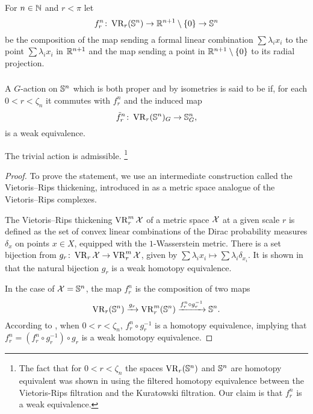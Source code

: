 \subsubsection{}\label{subsub:f}

For \(n \in \mathbb{N}\) and \(r < \pi\) let
\[
f_r^n \colon \operatorname{VR}_r(\mathbb{S}^n) \to \mathbb{R}^{n+1} \setminus \{0\} \to \mathbb{S}^n
\]
be the composition of the map sending a formal linear combination $\sum\lambda_i x_i$ to the point \(\sum\lambda_i x_i\) in \(\mathbb{R}^{n+1}\) and the map sending a point in \(\mathbb{R}^{n+1} \setminus \{0\}\) to its radial projection.

\subsubsection{}

A \(G\)-action on \(\mathbb{S}^n\) which is both proper and by isometries is said to be  if, for each $0 < r < \zeta_n$ it commutes with \(f_r^n\) and the induced map
\[
\tilde f_r^n \colon \operatorname{VR}_r(\mathbb{S}^n)_G \to \mathbb{S}^n_G,
\]
is a weak equivalence.

\medskip\lemma
The trivial action is admissible.
\footnote{The fact that for $0 < r < \zeta_n$ the spaces $\operatorname{VR}_r(\mathbb{S}^n)$ and $\mathbb{S}^n$ are homotopy equivalent was shown in \cite[Theorem 7.1]{lim2020vietoris} using the filtered homotopy equivalence between the Vietoris-Rips filtration and the Kuratowski filtration. Our claim is that $f_r^n$ is a weak equivalence.}

\begin{proof}
	To prove the statement, we use an intermediate construction called the Vietoris--Rips thickening, introduced in \cite{adamaszek2018metric} as a metric space analogue of the Vietoris--Rips complexes.

	The Vietoris--Rips thickening $\operatorname{VR}_r^m\mathcal{X}$ of a metric space $\mathcal{X}$ at a given scale $r$ is defined as the set of convex linear combinations of the Dirac probability measures $\delta_{x}$ on points $x \in X$, equipped with the $1$-Wasserstein metric.
	There is a set bijection from $g_r \colon \operatorname{VR}_r\mathcal{X} \to \operatorname{VR}_r^m\mathcal{X}$, given by $\sum \lambda_i x_i \mapsto \sum \lambda_i \delta_{x_i}.$
	It is shown in \cite[Theorem 1]{gillespie2024vietoris} that the natural bijection $g_r$ is a weak homotopy equivalence.

	In the case of $\mathcal{X} = \mathbb{S}^n$, the map $f_r^n$ is the composition of two maps
	\[
	\operatorname{VR}_r(\mathbb{S}^n) \xrightarrow{g_r} \operatorname{VR}_r^m(\mathbb{S}^n) \xrightarrow{f_r^n \circ g_r^{-1}} \mathbb{S}^n.
	\]
	According to \cite[Proposition 5.3]{adamaszek2018metric}, when $0<r<\zeta_n$, $f_r^n \circ g_r^{-1}$ is a homotopy equivalence, implying that $f_r^n = (f_r^n \circ g_r^{-1}) \circ g_r$ is a weak homotopy equivalence.
\end{proof}

